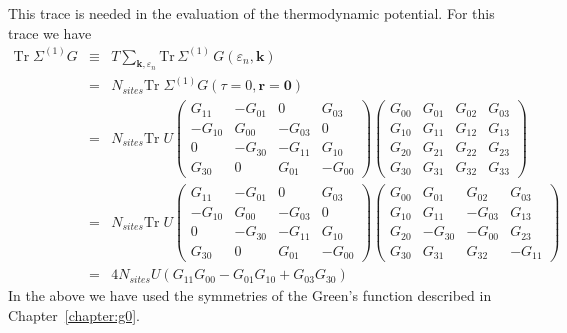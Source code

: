 This trace is needed in the evaluation of the thermodynamic
potential.  For this trace we have
\begin{eqnarray}
\mathrm{Tr}\; \Sigma^{(1)} G & \equiv &
      T \sum_{\mathbf{k},\varepsilon_n}
 \textrm{Tr}\, \Sigma^{(1)}\, 
G(\varepsilon_n,\mathbf{k})
\\
& = & 
  N_{sites} 
\mathrm{Tr}\; \Sigma^{(1)} G(\tau=0,\mathbf{r}=\mathbf{0}) \\
 & = &   N_{sites} 
\mathrm{Tr}\; U
\begin{pmatrix}
G_{11} & -G_{01} & 0 & G_{03} \\
-G_{10} & G_{00} & -G_{03} & 0 \\
0  & -G_{30} & -G_{11} & G_{10} \\
G_{30} & 0 & G_{01} & -G_{00}
\end{pmatrix}
\begin{pmatrix}
G_{00} & G_{01} & G_{02} & G_{03} \\
G_{10} & G_{11} & G_{12} & G_{13} \\
G_{20}  & G_{21} & G_{22} & G_{23} \\
G_{30} & G_{31} & G_{32} & G_{33}
\end{pmatrix}
\\
& = &
 N_{sites} 
\mathrm{Tr}\; U
\begin{pmatrix}
G_{11} & -G_{01} & 0 & G_{03} \\
-G_{10} & G_{00} & -G_{03} & 0 \\
0  & -G_{30} & -G_{11} & G_{10} \\
G_{30} & 0 & G_{01} & -G_{00}
\end{pmatrix}
\begin{pmatrix}
G_{00} & G_{01} & G_{02} & G_{03} \\
G_{10} & G_{11} & -G_{03} & G_{13} \\
G_{20}  & -G_{30} & -G_{00} & G_{23} \\
G_{30} & G_{31} & G_{32} & -G_{11}
\end{pmatrix}
\\
& = & 4 N_{sites} U (G_{11}G_{00} - G_{01}G_{10} + G_{03}G_{30}) 
\end{eqnarray}
In the above we have used the symmetries of the Green's function
described in Chapter~\ref{chapter:g0}.

